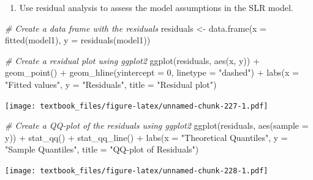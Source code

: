 \documentclass[
  11pt,
]{book}
\newenvironment{Shaded}{\begin{snugshade}}{\end{snugshade}}
\newcommand{\AttributeTok}[1]{\textcolor[rgb]{0.77,0.63,0.00}{#1}}
\newcommand{\CommentTok}[1]{\textcolor[rgb]{0.56,0.35,0.01}{\textit{#1}}}
\newcommand{\DecValTok}[1]{\textcolor[rgb]{0.00,0.00,0.81}{#1}}
\newcommand{\FunctionTok}[1]{\textcolor[rgb]{0.00,0.00,0.00}{#1}}
\newcommand{\NormalTok}[1]{#1}
\newcommand{\OtherTok}[1]{\textcolor[rgb]{0.56,0.35,0.01}{#1}}
\newcommand{\SpecialCharTok}[1]{\textcolor[rgb]{0.00,0.00,0.00}{#1}}
\newcommand{\StringTok}[1]{\textcolor[rgb]{0.31,0.60,0.02}{#1}}
\providecommand{\tightlist}{%
  \setlength{\itemsep}{0pt}\setlength{\parskip}{0pt}}
\theoremstyle{definition}
\theoremstyle{definition}
\theoremstyle{definition}
\theoremstyle{definition}
\theoremstyle{remark}
\begin{document}
\newpage

\begin{enumerate}
\def\labelenumi{(\alph{enumi})}
\setcounter{enumi}{4}
\tightlist
\item
  Use residual analysis to assess the model assumptions in the SLR model.
\end{enumerate}

\begin{Shaded}
\begin{Highlighting}[]
\CommentTok{\# Create a data frame with the residuals}
\NormalTok{residuals }\OtherTok{\textless{}{-}} \FunctionTok{data.frame}\NormalTok{(}\AttributeTok{x =} \FunctionTok{fitted}\NormalTok{(model1), }\AttributeTok{y =} \FunctionTok{residuals}\NormalTok{(model1))}

\CommentTok{\# Create a residual plot using ggplot2}
\FunctionTok{ggplot}\NormalTok{(residuals, }\FunctionTok{aes}\NormalTok{(x, y)) }\SpecialCharTok{+}
  \FunctionTok{geom\_point}\NormalTok{() }\SpecialCharTok{+}
  \FunctionTok{geom\_hline}\NormalTok{(}\AttributeTok{yintercept =} \DecValTok{0}\NormalTok{, }\AttributeTok{linetype =} \StringTok{"dashed"}\NormalTok{) }\SpecialCharTok{+}
  \FunctionTok{labs}\NormalTok{(}\AttributeTok{x =} \StringTok{"Fitted values"}\NormalTok{, }\AttributeTok{y =} \StringTok{"Residuals"}\NormalTok{, }\AttributeTok{title =} \StringTok{"Residual plot"}\NormalTok{)}
\end{Highlighting}
\end{Shaded}

\texttt{[image: textbook\_files/figure-latex/unnamed-chunk-227-1.pdf]}

\newpage

\begin{Shaded}
\begin{Highlighting}[]
\CommentTok{\# Create a QQ{-}plot of the residuals using ggplot2}
\FunctionTok{ggplot}\NormalTok{(residuals, }\FunctionTok{aes}\NormalTok{(}\AttributeTok{sample =}\NormalTok{ y)) }\SpecialCharTok{+}
  \FunctionTok{stat\_qq}\NormalTok{() }\SpecialCharTok{+}
  \FunctionTok{stat\_qq\_line}\NormalTok{() }\SpecialCharTok{+}
  \FunctionTok{labs}\NormalTok{(}\AttributeTok{x =} \StringTok{"Theoretical Quantiles"}\NormalTok{, }\AttributeTok{y =} \StringTok{"Sample Quantiles"}\NormalTok{, }\AttributeTok{title =} \StringTok{"QQ{-}plot of Residuals"}\NormalTok{)}
\end{Highlighting}
\end{Shaded}

\texttt{[image: textbook\_files/figure-latex/unnamed-chunk-228-1.pdf]}
\end{document}
